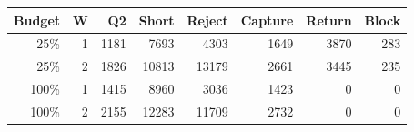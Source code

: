 \begin{tabular}{rrrrrrrr}
\toprule
Budget & W & Q2 & Short & Reject & Capture & Return & Block \\
\midrule
25\% & 1 & 1181 & 7693 & 4303 & 1649 & 3870 & 283 \\
25\% & 2 & 1826 & 10813 & 13179 & 2661 & 3445 & 235 \\
100\% & 1 & 1415 & 8960 & 3036 & 1423 & 0 & 0 \\
100\% & 2 & 2155 & 12283 & 11709 & 2732 & 0 & 0 \\
\bottomrule
\end{tabular}
